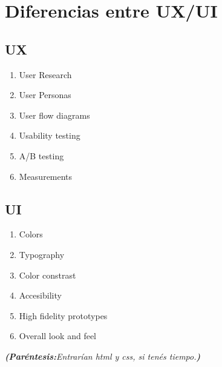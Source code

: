 \section{Diferencias entre UX/UI}
\subsection{UX}
\begin{enumerate}
    \item User Research
    \item User Personas 
    \item User flow diagrams
    \item Usability testing
    \item A/B testing 
    \item Measurements
\end{enumerate}
\subsection{UI}
\begin{enumerate}
    \item Colors 
    \item Typography
    \item Color constrast 
    \item Accesibility 
    \item High fidelity prototypes 
    \item Overall look and feel
\end{enumerate}
\emph{\textbf{(Paréntesis:}Entrarían html y css, si tenés tiempo.\textbf{)}}
